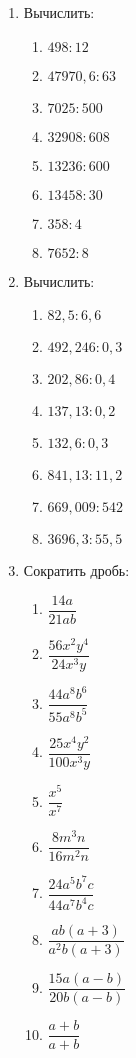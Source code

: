\documentclass[12pt, a4paper]{article}
\begin{document}
	
 \cfoot{}
\begin{enumerate}
	\item Вычислить:
	\begin{multicols}{2}
		\begin{enumerate}[label=\textbf{\arabic*)}]
			\item $498:12$
			\item $47970,6:63$
			\item $7025:500$
			\item $32908:608$
			\item $13236:600$
			\item $13458:30$
			\item $358:4$
			\item $7652:8$
		\end{enumerate}
	\end{multicols}
	\item Вычислить:
\begin{multicols}{2}
	\begin{enumerate}[label=\textbf{\arabic*)}]
		\item $82,5:6,6$
		\item $492,246:0,3$
		\item $202,86:0,4$
		\item $137,13:0,2$
		\item $132,6:0,3$
		\item $841,13:11,2$
		\item $669,009:542$
		\item $3696,3:55,5$
	\end{enumerate}
\end{multicols}
	\item Сократить дробь:
	\begin{multicols}{3}
		\begin{enumerate}
			\item $\dfrac{14a}{21ab}$
			\item $\dfrac{56x^2y^4}{24x^3y}$
			\item $\dfrac{44a^8b^6}{55a^8b^5}$
			\item $\dfrac{25x^4y^2}{100x^3y}$ 
			\item $\dfrac{x^5}{x^7}$
			\item $\dfrac{8m^3n}{16m^2n}$
			\item $\dfrac{24a^5b^7c}{44a^7b^4c}$
			\item $\dfrac{ab(a+3)}{a^2b(a+3)}$
			\item $\dfrac{15a(a-b)}{20b(a-b)}$
			\item $\dfrac{a+b}{a+b}$

\end{enumerate}
\end{multicols}
\end{enumerate}
\end{document}
